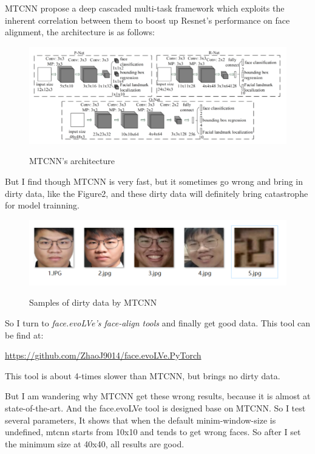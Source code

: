 \documentclass{article}
\begin{document}
MTCNN propose a deep cascaded multi-task framework which
exploits the inherent correlation between them to boost up Resnet's performance on face alignment, the architecture is as follows:
\begin{figure}[H]%
  \centering
  \caption{MTCNN's architecture}
  \includegraphics[width=\columnwidth]{IMG/MTCNN.png} %
  \label{Fig.RNN} %
\end{figure}
But I find though MTCNN is very fast, but it sometimes go wrong and bring in dirty data, like the Figure2, and these dirty data will definitely bring catastrophe for model trainning.
\begin{figure}[H]%
  \centering
  \caption{Samples of dirty data by MTCNN}
  \includegraphics[width=\columnwidth]{IMG/ML大作业筛选展示.png} %
  \label{Fig.RNN} %
\end{figure}
So I turn to \textit{face.evoLVe's face-align tools} and finally get good data.
This tool can be find at:
\begin{center}
  \url{https://github.com/ZhaoJ9014/face.evoLVe.PyTorch}
\end{center}
This tool is about 4-times slower than MTCNN, but brings no dirty data.

But I am wandering why MTCNN get these wrong results, because it is almost at state-of-the-art. And the face.evoLVe tool is designed base on MTCNN. So I test several parameters, It shows that when the default minim-window-size is undefined, mtcnn starts from 10x10 and tends to get wrong faces. So after I set the minimum size at 40x40, all results are good. 
\end{document}
